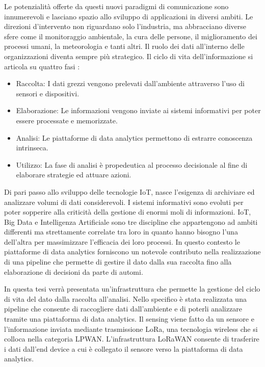 \documentclass[12pt,a4paper,openright,twoside]{report}
\begin{document}
Le potenzialit\`a offerte da questi nuovi paradigmi di comunicazione sono innumerevoli e lasciano spazio allo sviluppo di applicazioni in diversi ambiti. Le direzioni d'intervento non riguardano solo l'industria, ma abbracciano diverse sfere come il monitoraggio ambientale, la cura delle persone, il miglioramento dei processi umani, la meteorologia e tanti altri.
Il ruolo dei dati all'interno delle organizzazioni diventa sempre pi\`u strategico. Il ciclo di vita dell'informazione si articola  su quattro fasi \cite{K27}:
\begin{itemize}                       
\item Raccolta: I dati grezzi vengono prelevati dall'ambiente attraverso l'uso di sensori e dispositivi.
\item Elaborazione: Le informazioni vengono inviate ai sistemi informativi per poter essere processate e memorizzate.
\item Analisi: Le piattaforme di data analytics permettono di estrarre conoscenza intrinseca.
\item Utilizzo: La fase di analisi \`e propedeutica al processo decisionale al fine di elaborare strategie ed attuare azioni.
\end{itemize}

Di pari passo allo sviluppo delle tecnologie IoT, nasce l'esigenza di archiviare ed analizzare volumi di dati considerevoli. I sistemi informativi sono evoluti per poter sopperire alla criticit\`a della gestione di enormi moli di informazioni. 
IoT, Big Data e Intelligenza Artificiale sono tre discipline che appartengono ad ambiti differenti ma strettamente correlate tra loro in quanto hanno bisogno l'una dell'altra per massimizzare l'efficacia dei loro processi. 
In questo contesto le piattaforme di data analytics forniscono un notevole contributo nella realizzazione di una pipeline che permette di gestire il dato dalla sua raccolta fino alla elaborazione di decisioni da parte di automi.

In questa tesi verr\`a presentata un'infrastruttura che permette la gestione del ciclo di vita del dato dalla raccolta all'analisi. Nello specifico \`e stata realizzata una pipeline che consente di raccogliere dati dall'ambiente e di poterli analizzare tramite una piattaforma di data analytics.
Il sensing viene fatto da un sensore e l'informazione inviata mediante trasmissione LoRa, una tecnologia wireless che si colloca nella categoria LPWAN. L'infrastruttura LoRaWAN consente di trasferire i dati dall'end device a cui \`e collegato il sensore verso la piattaforma di data analytics.
\end{document}
